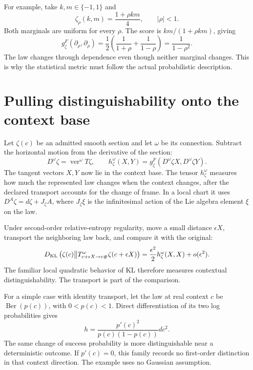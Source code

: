 For example, take $k,m\in\{-1,1\}$ and
\begin{equation}
\zeta_\rho(k,m)=\frac{1+\rho km}{4},
\qquad |\rho|<1.
\end{equation}
Both marginals are uniform for every $\rho$. The score is $km/(1+\rho km)$, giving
\begin{equation}
g^F_\zeta(\partial_\rho,\partial_\rho)
=\frac12\left(\frac1{1+\rho}+\frac1{1-\rho}\right)
=\frac1{1-\rho^2}.
\end{equation}
The law changes through dependence even though neither marginal changes. This is why the statistical metric must follow the actual probabilistic description.

\section{Pulling distinguishability onto the context base}

Let $\zeta(c)$ be an admitted smooth section and let $\omega$ be its connection. Subtract the horizontal motion from the derivative of the section:
\begin{equation}
D^\omega\zeta=\operatorname{ver}^\omega T\zeta,
\qquad
h^\omega_\zeta(X,Y)
=g^F_\zeta(D^\omega\zeta X,D^\omega\zeta Y).
\label{comp:eq-pullback}
\end{equation}
The tangent vectors $X,Y$ now lie in the context base. The tensor $h^\omega_\zeta$ measures how much the represented law changes when the context changes, after the declared transport accounts for the change of frame. In a local chart it uses $D^A\zeta=d\zeta+J_\zeta A$, where $J_\zeta\xi$ is the infinitesimal action of the Lie algebra element $\xi$ on the law.

Under second-order relative-entropy regularity, move a small distance $\epsilon X$, transport the neighboring law back, and compare it with the original:
\begin{equation}
D_{\mathrm{KL}}\left(\zeta(c)\middle\|
T^\omega_{c+\epsilon X\to c \#}\zeta(c+\epsilon X)\right)
=\frac{\epsilon^2}{2}h^\omega_\zeta(X,X)+o(\epsilon^2).
\end{equation}
The familiar local quadratic behavior of KL therefore measures contextual distinguishability. The transport is part of the comparison.

For a simple case with identity transport, let the law at real context $c$ be $\operatorname{Ber}(p(c))$, with $0<p(c)<1$. Direct differentiation of its two log probabilities gives
\begin{equation}
h=\frac{p'(c)^2}{p(c)(1-p(c))}dc^2.
\end{equation}
The same change of success probability is more distinguishable near a deterministic outcome. If $p'(c)=0$, this family records no first-order distinction in that context direction. The example uses no Gaussian assumption.

